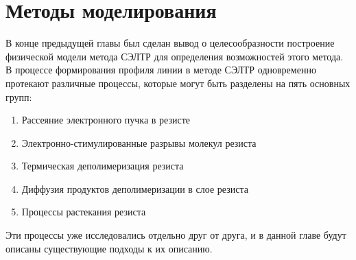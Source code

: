 \chapter{Методы моделирования}

В конце предыдущей главы был сделан вывод о целесообразности построение физической модели метода СЭЛТР для определения возможностей этого метода. В процессе формирования профиля линии в методе СЭЛТР одновременно протекают различные процессы, которые могут быть разделены на пять основных групп:
\begin{enumerate}
	\item Рассеяние электронного пучка в резисте
	\item Электронно-стимулированные разрывы молекул резиста
	\item Термическая деполимеризация резиста
	\item Диффузия продуктов деполимеризации в слое резиста
	\item Процессы растекания резиста
\end{enumerate}

Эти процессы уже исследовались отдельно друг от друга, и в данной главе будут описаны существующие подходы к их описанию.


%









